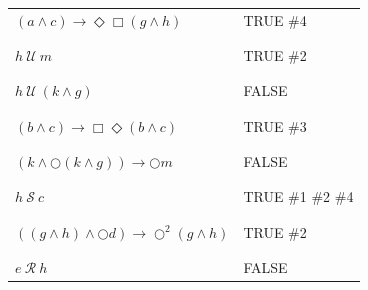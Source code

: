 \documentclass[12pt]{article}
\begin{document}
\begin{enumerate}
\begin{table}
\begin{tabular}{|l|l|}
$(a \wedge c) \rightarrow \Diamond \Box (g \wedge h)$	 &TRUE \#4\\

&\\

\hline

&\\

$h ~\mathcal{U}~ m$									 &TRUE \#2\\

&\\

\hline

&\\

$h ~\mathcal{U}~ (k \wedge g)$						 &FALSE\\

&\\

\hline

&\\

$(b \wedge c) \rightarrow \Box \Diamond (b \wedge c)$  &TRUE \#3\\

&\\

\hline

&\\

$(k \wedge \bigcirc (k \wedge g)) \rightarrow \bigcirc m$  &FALSE\\

&\\

\hline

&\\

$ h ~\mathcal{S}~ c$								 &TRUE \#1 \#2 \#4\\

&\\

\hline

&\\

$ ((g \wedge h) \wedge \bigcirc d) \rightarrow \bigcirc^{2} (g \wedge h)$  &TRUE \#2\\

&\\

\hline

&\\

$e ~\mathcal{R}~ h$									 &FALSE\\


\end{tabular}
\end{table}
\end{enumerate}
\end{document}
